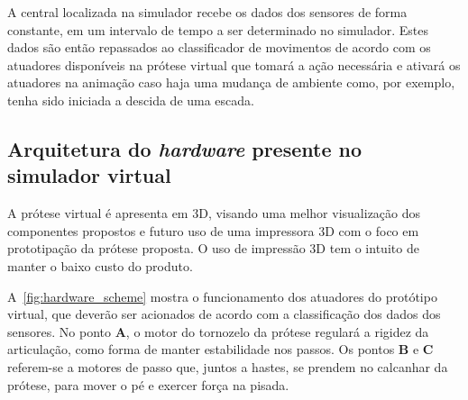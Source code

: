 A central localizada na simulador recebe os dados dos sensores de forma constante, em um intervalo de tempo a ser determinado no simulador. Estes dados são então repassados ao classificador de movimentos de acordo com os atuadores disponíveis na prótese virtual que tomará a ação necessária e ativará os atuadores na animação caso haja uma mudança de ambiente como, por exemplo, tenha sido iniciada a descida de uma escada.

% 

\subsection{Arquitetura do \textit{hardware} presente no simulador virtual}\label{sec:metodo_prot_hardware}

A prótese virtual é apresenta em 3D, visando uma melhor visualização dos componentes propostos e futuro uso de uma impressora 3D com o foco em prototipação da prótese proposta. O uso de impressão 3D tem o intuito de manter o baixo custo do produto.

A~\autoref{fig:hardware_scheme} mostra o funcionamento dos atuadores do protótipo virtual, que deverão ser acionados de acordo com a classificação dos dados dos sensores. No ponto \textbf{A}, o motor do tornozelo da prótese regulará a rigidez da articulação, como forma de manter estabilidade nos passos. Os pontos \textbf{B} e \textbf{C} referem-se a motores de passo que, juntos a hastes, se prendem no calcanhar da prótese, para mover o pé e exercer força na pisada.

